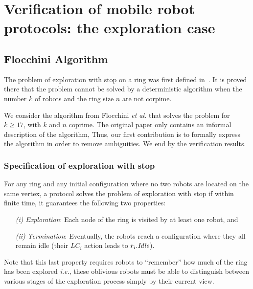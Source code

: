 
\part[Verification of mobile robot protocols]{Verification of mobile robot protocols: the exploration case}
\label{part:verif}      



                                                                               
	\chapter{Flocchini Algorithm}
The problem of exploration with stop on a ring was first defined in~\cite{flocchini_computing_2007}.
It is proved there that the problem cannot be solved by a deterministic algorithm when the
number $k$ of robots and the ring size $n$ are not corpime.   
  
We consider the algorithm from Flocchini \emph{et al.} that solves the problem for $k \geq 17$, 
with $k$ and $n$ coprime.
The original paper only contains an informal description of the
algorithm, Thus, our first contribution is to formally express the
algorithm in order to remove ambiguities.  
We end by the verification results.  
	\label{sec:flo}
	
	
\section{Specification of exploration with stop} 
\label{subsub: specification}
For any ring and any
initial configuration where no two robots are located on the same vertex, 
a protocol solves the problem of exploration with stop if within
finite time, it
guarantees the following two properties: 
\begin{itemize}
\item[\emph{(i)}] \emph{Exploration}: 
 Each node of the ring is visited by at least one robot, and
\item[\emph{(ii)}] \emph{Termination}:  Eventually, the robots reach a
  configuration where they all remain idle (their $\textit{LC}_i$
  action leads to $r_i.\textit{Idle}$).
\end{itemize}
Note that this last property requires robots to ``remember'' how much
of the ring has been explored \emph{i.e.}, these oblivious robots
must be able to distinguish between various stages of the exploration
process simply by their current view.

